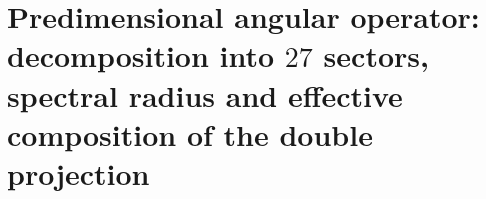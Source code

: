 \chapter{Predimensional angular operator: decomposition into \(27\) sectors, spectral radius and effective composition of the double projection}
\label{chap:p3-final:37:operador_angular}

